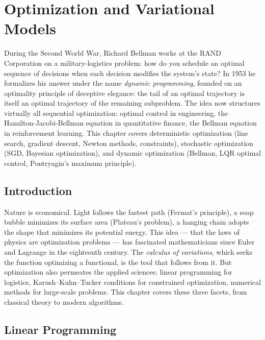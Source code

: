 \chapter{Optimization and Variational Models}
\label{ch:optimization}

During the Second World War, Richard Bellman works at the RAND Corporation on a military-logistics problem: how do you schedule an optimal sequence of decisions when each decision modifies the system's state? In 1953 he formalizes his answer under the name \emph{dynamic programming}, founded on an optimality principle of deceptive elegance: the tail of an optimal trajectory is itself an optimal trajectory of the remaining subproblem. The idea now structures virtually all sequential optimization: optimal control in engineering, the Hamilton-Jacobi-Bellman equation in quantitative finance, the Bellman equation in reinforcement learning. This chapter covers deterministic optimization (line search, gradient descent, Newton methods, constraints), stochastic optimization (SGD, Bayesian optimization), and dynamic optimization (Bellman, LQR optimal control, Pontryagin's maximum principle).

\section{Introduction}

Nature is economical. Light follows the fastest path (Fermat's principle), a soap bubble minimizes its surface area (Plateau's problem), a hanging chain adopts the shape that minimizes its potential energy. This idea --- that the laws of physics are optimization problems --- has fascinated mathematicians since Euler and Lagrange in the eighteenth century. The \emph{calculus of variations}, which seeks the function optimizing a functional, is the tool that follows from it. But optimization also permeates the applied sciences: linear programming for logistics, Karush--Kuhn--Tucker conditions for constrained optimization, numerical methods for large-scale problems. This chapter covers these three facets, from classical theory to modern algorithms.

\section{Linear Programming}
\label{sec:lp}

